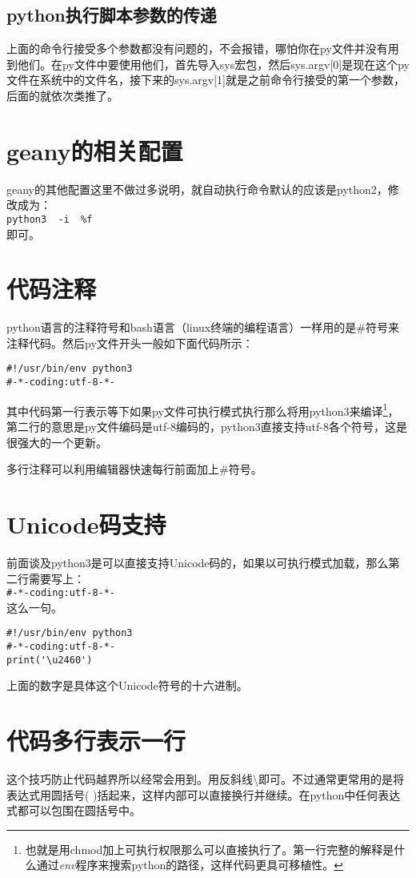\documentclass[12pt,oneside]{book}
\begin{document}
\begin{common-format}
\subsection{python执行脚本参数的传递}
上面的命令行接受多个参数都没有问题的，不会报错，哪怕你在py文件并没有用到他们。在py文件中要使用他们，首先导入sys宏包，然后sys.argv[0]是现在这个py文件在系统中的文件名，接下来的sys.argv[1]就是之前命令行接受的第一个参数，后面的就依次类推了。


\section{geany的相关配置}
geany的其他配置这里不做过多说明，就自动执行命令默认的应该是python2，修改成为：\\
\verb+python3  -i  %f  +\\
即可。


\section{代码注释}
python语言的注释符号和bash语言（linux终端的编程语言）一样用的是\#{}符号来注释代码。然后py文件开头一般如下面代码所示：
\begin{Verbatim}
#!/usr/bin/env python3
#-*-coding:utf-8-*-
\end{Verbatim}
其中代码第一行表示等下如果py文件可执行模式执行那么将用python3来编译\footnote{也就是用chmod加上可执行权限那么可以直接执行了。第一行完整的解释是什么通过\textit{env}程序来搜索python的路径，这样代码更具可移植性。}，第二行的意思是py文件编码是utf-8编码的，python3直接支持utf-8各个符号，这是很强大的一个更新。


多行注释可以利用编辑器快速每行前面加上\#{}符号。

\section{Unicode码支持}
前面谈及python3是可以直接支持Unicode码的，如果以可执行模式加载，那么第二行需要写上：\\
\verb+#-*-coding:utf-8-*-+\\
这么一句。

\begin{Verbatim}
#!/usr/bin/env python3
#-*-coding:utf-8-*-
print('\u2460')
\end{Verbatim}
上面的数字是具体这个Unicode符号的十六进制。

\section{代码多行表示一行}
这个技巧防止代码越界所以经常会用到。用反斜线\textbackslash 即可。不过通常更常用的是将表达式用圆括号( )括起来，这样内部可以直接换行并继续。在python中任何表达式都可以包围在圆括号中。


\end{common-format}
\end{document}
